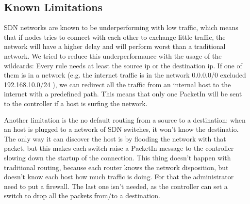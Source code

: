 \documentclass[conference,10pt]{IEEEtran}
\begin{document}
\subsection{Known Limitations}
SDN networks are known to be underperforming with low traffic, which means that if nodes tries to connect with each other
to exchange little traffic, the network will have a higher delay and will perform worst than a
traditional network. We tried to reduce this underperformance with the usage of the wildcards:
Every rule needs at least the source ip or the destination ip. If one of them is in a network
(e.g. the internet traffic is in the network 0.0.0.0/0 excluded 192.168.10.0/24 ),
we can redirect all the traffic from an internal host to the internet with a predefined
path. This means that only one PacketIn will be sent to the controller if a host is surfing the network.

Another limitation is the no default routing from a source to a destination: when an host
is plugged to a network of SDN switches, it won't know the destinatio. The only way it can
discover the host is by flooding the network with that packet, but this makes each switch raise a PacketIn message to the controller
slowing down the startup of the connection. This thing doesn't happen with traditional routing, because each router knows
the network disposition, but doesn't know each host how much traffic is doing. For that the administrator need to put a firewall.
The last one isn't needed, as the controller can set a switch to drop all the packets from/to a destination.
\end{document}
